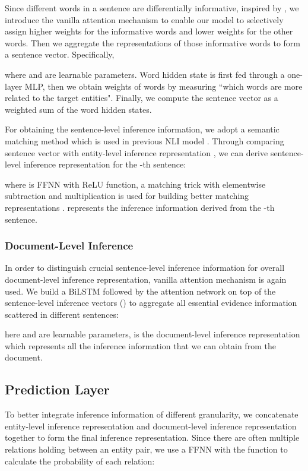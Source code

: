 \documentclass[runningheads]{llncs}
\begin{document}
Since different words in a sentence are differentially informative, inspired by \cite{yang2016hierarchical}, we introduce the vanilla attention mechanism to enable our model to selectively assign higher weights for the informative words and lower weights for the other words.
Then we aggregate the representations of those informative words to form a sentence vector. Specifically,

where  and  are learnable parameters.
Word hidden state  is first fed through a one-layer MLP,
then we obtain weights of words by measuring ``which words are more related to the target entities".
Finally, we compute the sentence vector  as a weighted sum of the word hidden states. 

For obtaining the sentence-level inference information, we adopt a semantic matching method which is used in previous NLI model \cite{chen2016enhanced}. Through comparing sentence vector  with entity-level inference representation , we can derive sentence-level inference representation  for the -th sentence:

where  is FFNN with ReLU function, a matching trick with elementwise subtraction and multiplication is used for building better matching representations \cite{Mou2015NaturalLI}.
 represents the inference information derived from the -th sentence.

\subsubsection{Document-Level Inference}
In order to distinguish crucial sentence-level inference information for overall document-level inference representation,
vanilla attention  mechanism is again used.
We build a BiLSTM followed by the attention network on top of the sentence-level inference vectors () to aggregate all essential evidence information scattered in different sentences:

here  and  are learnable parameters,
 is the document-level inference representation which represents all the inference information that we can obtain from the document.

\subsection{Prediction Layer}
To better integrate inference information of different granularity, 
we concatenate entity-level inference representation  and document-level inference representation  together to form the final inference representation.
Since there are often multiple relations holding between an entity pair, we use a FFNN with the  function to calculate the probability of each relation:
\end{document}
